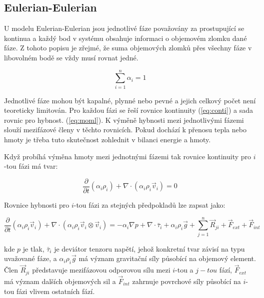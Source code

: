 \subsection{Eulerian-Eulerian}
U modelu Eulerian-Eulerian jsou jednotlivé fáze považovány za prostupující se kontinua a každý bod v systému obsahuje informaci o objemovém zlomku dané fáze. Z tohoto popisu je zřejmé, že suma objemových zlomků přes všechny fáze v libovolném bodě se vždy musí rovnat jedné. 

\begin{equation}
	\sum_{i=1}^n \alpha_{i} = 1
	\label{eq:volfrac}
\end{equation} 

\noindent Jednotlivé fáze mohou být kapalné, plynné nebo pevné a jejich celkový počet není teoreticky limitován. Pro každou fázi se řeší rovnice kontinuity (\ref{eq:conti}) a sada rovnic pro hybnost. (\ref{eq:moml}). K výměně hybnosti mezi jednotlivými fázemi slouží mezifázové členy v těchto rovnicích. Pokud dochází k přenosu tepla nebo hmoty je třeba tuto skutečnost zohlednit v bilanci energie a hmoty.    

Když probíhá výměna hmoty mezi jednotnými fázemi tak rovnice kontinuity pro $i$-tou fázi má tvar:

\begin{equation}
	\frac{\partial}{\partial t} (\alpha_{i}\rho_{i}) +  \nabla \cdot (\alpha_{i}\rho_{i}\vec{v}_{i}) = 0
	\label{eq:conti}
\end{equation}

\noindent Rovnice hybnosti pro $i$-tou fázi za stejných předpokladů lze zapsat jako:

\begin{equation}
	\frac{\partial}{\partial t} (\alpha_{i}\rho_{i}\vec{v}_{i}) + \nabla \cdot (\alpha_{i}\rho_{i} \vec{v}_{i} \otimes \vec{v}_{i}) = -\alpha_{i} \nabla p + \nabla \cdot \bar{\tau}_{i} + \alpha_{i}\rho_{i}\vec{g} + \sum_{j=1}^n \vec{R}_{ji} + \vec{F}_{ext} + \vec{F}_{int}
	\label{eq:moml}
\end{equation}

\noindent kde $p$ je tlak, $\bar{\tau}_{i}$ je deviátor tenzoru napětí, jehož konkretní tvar závisí na typu uvažované fáze, a $\alpha_{i}\rho_{i}\vec{g}$ má význam gravitační síly působící na objemový element. Člen $\vec{R}_{ji}$ představuje mezifázovou odporovou sílu mezi $i$-tou a $j-tou$ fází, $\vec{F}_{ext}$ má význam dalších objemových sil a $\vec{F}_{int}$ zahrnuje povrchové síly působící na $i$-tou fázi vlivem ostatních fází. 

